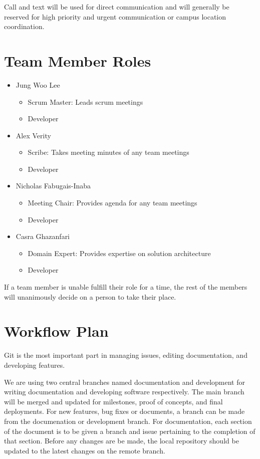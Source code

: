 \documentclass{article}
\begin{document}
Call and text will be used for direct communication
and will generally be reserved for high priority and urgent communication or 
campus location coordination. 

\section{Team Member Roles}

\begin{itemize}
	\item Jung Woo Lee
	\begin{itemize}
	  \item Scrum Master: Leads scrum meetings
	  \item Developer
  \end{itemize}
	\item Alex Verity
  \begin{itemize}
    \item Scribe: Takes meeting minutes of any team meetings
	  \item Developer
  \end{itemize}
  \item Nicholas Fabugais-Inaba
  \begin{itemize}
    \item Meeting Chair: Provides agenda for any team meetings
	  \item Developer
  \end{itemize}
  \item Casra Ghazanfari
  \begin{itemize}
    \item Domain Expert: Provides expertise on solution architecture
	  \item Developer
  \end{itemize}
\end{itemize}

If a team member is unable fulfill their role for a time, the rest of the members will
unanimously decide on a person to take their place. 

\section{Workflow Plan}

Git is the most important part in managing issues, editing documentation, and developing features.
\newline

We are using two central branches named documentation and development for writing documentation
and developing software respectively.
The main branch will be merged and updated for milestones, proof of concepts, and
final deployments.
For new features, bug fixes or documents, a branch can be made from the documenation or development branch.
For documentation, each section of the document is to be given a branch and issue pertaining to the completion of that section.
Before any changes are be made, the local repository should be updated to the latest changes on
the remote branch.\newline
\end{document}
